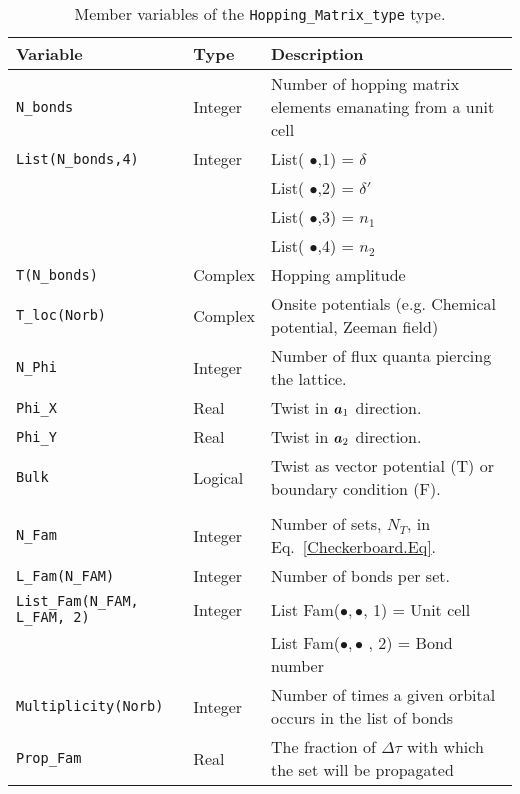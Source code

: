 \begin{table}[h]
    \begin{tabular}{@{} l l l @{}}\toprule
    Variable & Type & Description \\\midrule
     \texttt{N\_bonds}  &  Integer  &      Number of  hopping  matrix elements emanating from a unit cell   \\
     \texttt{List(N\_bonds,4)}    & Integer &  List( $\bullet$,1) =   $\delta$ \\
                                              &              &  List( $\bullet$,2) =   $\delta'$ \\
                                              &              &  List( $\bullet$,3) =   $n_1$     \\
                                              &              &  List( $\bullet$,4) =   $n_2$     \\ 
     \texttt{T(N\_bonds)}          & Complex &   Hopping amplitude   \\
     \texttt{T\_loc(Norb)}           & Complex &    Onsite  potentials (e.g.  Chemical potential, Zeeman field)   \\
     \texttt{N\_Phi}                    & Integer     &  Number of  flux quanta piercing the lattice.   \\
     \texttt{Phi\_X}                    &  Real        &   Twist in $\boldsymbol{a}_1$  direction.   \\
     \texttt{Phi\_Y}                    &  Real        &   Twist in $\boldsymbol{a}_2$  direction.   \\
     \texttt{Bulk}                        &   Logical   &   Twist as vector potential (T) or  boundary condition (F).
        \\  \\
      \texttt{N\_Fam}                &  Integer  &      Number of  sets, $N_T$, in Eq.~\eqref{Checkerboard.Eq}.   \\
      \texttt{L\_Fam(N\_FAM)}  &  Integer &       Number of bonds per  set.   \\    
      \texttt{List\_Fam(N\_FAM, L\_FAM, 2)}     &  Integer  &   List Fam($ \bullet,\bullet $, 1) =  Unit cell \\
                                              &                        &          List Fam($\bullet,\bullet$ , 2) =   Bond number \\
       \texttt{Multiplicity(Norb)} & Integer           &        Number of  times a  given orbital  occurs in the list of bonds  \\
       \texttt{Prop\_Fam} &  Real            &         The fraction of $ \Delta \tau $   with which the set will be propagated   \                                
        \\\bottomrule
   \end{tabular}
   \caption{Member variables of the \texttt{Hopping\_Matrix\_type}  type.   
    \label{table:Hopping_matrix}}
\end{table}


